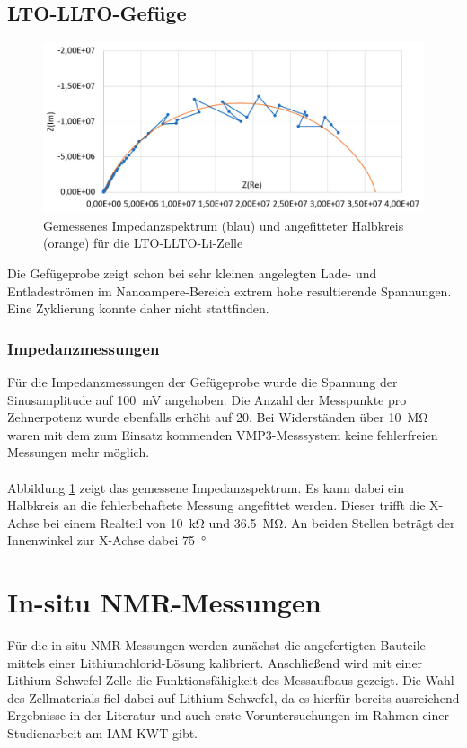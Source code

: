 \documentclass[a4paper, 11pt, headsepline,footsepline,twoside,abstract]{scrbook}
\begin{document}
\subsection{LTO-LLTO-Gefüge}
\begin{figure}
	\centering
	\includegraphics[width=1.00\columnwidth]{images/IS_Gefuege.jpg}
	\caption{Gemessenes Impedanzspektrum (blau) und angefitteter Halbkreis (orange) für die LTO-LLTO-Li-Zelle}
	\label{is_Gefuege}
\end{figure}
Die Gefügeprobe zeigt schon bei sehr kleinen angelegten Lade- und Entladeströmen im Nanoampere-Bereich extrem hohe resultierende Spannungen. Eine Zyklierung konnte daher nicht stattfinden.
\subsubsection{Impedanzmessungen}
Für die Impedanzmessungen der Gefügeprobe wurde die Spannung der Sinusamplitude auf \SI{100}{\milli\volt} angehoben. Die Anzahl der Messpunkte pro Zehnerpotenz wurde ebenfalls erhöht auf 20. Bei Widerständen über \SI{10}{\mega\ohm} waren mit dem zum Einsatz kommenden VMP3-Messsystem keine fehlerfreien Messungen mehr möglich.
\\\\
Abbildung \ref{is_Gefuege} zeigt das gemessene Impedanzspektrum. Es kann dabei ein Halbkreis an die fehlerbehaftete Messung angefittet werden. Dieser trifft die X-Achse bei einem Realteil von \SI{10}{\kilo\ohm} und \SI{36.5}{\mega\ohm}. An beiden Stellen beträgt der Innenwinkel zur X-Achse dabei \SI{75}{\degree}
\newpage
\section{In-situ NMR-Messungen}
Für die in-situ NMR-Messungen werden zunächst die angefertigten Bauteile mittels einer Lithiumchlorid-Lösung kalibriert. Anschließend wird mit einer Lithium-Schwefel-Zelle die Funktionsfähigkeit des Messaufbaus gezeigt. Die Wahl des Zellmaterials fiel dabei auf Lithium-Schwefel, da es hierfür bereits ausreichend Ergebnisse in der Literatur und auch erste Voruntersuchungen im Rahmen einer Studienarbeit am IAM-KWT gibt.
\end{document}
